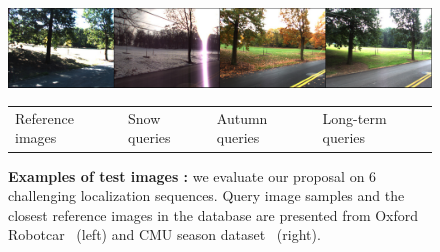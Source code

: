 \begin{figure}
\begin{minipage}{0.545\linewidth}
		\includegraphics[width=\linewidth]{details/cmu_exs/ex4}	
		
		\scriptsize
		\begin{tabularx}{\linewidth}{X X X X}
			Reference images & Snow queries & Autumn queries & Long-term queries 
		\end{tabularx}
	\end{minipage}
	
	

	\caption[Examples of test images]{\label{fig:dataset} \textbf{Examples of test images :} we evaluate our proposal on 6 challenging localization sequences. Query image samples and the closest reference images in the database are presented from Oxford Robotcar~\cite{Maddern2016} (left) and CMU season dataset~\cite{Bansal2014a} (right).}
\end{figure}
